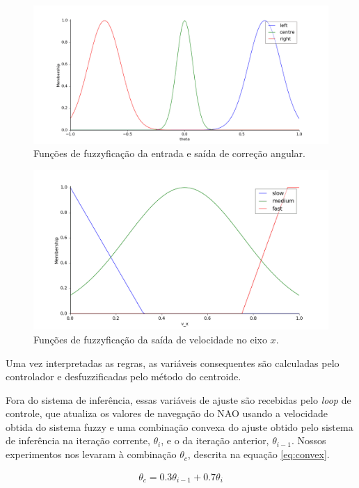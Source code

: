 \documentclass[twoside,conference,a4paper]{IEEEtran}
\begin{document}
\begin{figure}[ht]
\centering
\includegraphics[width=1\hsize]{figuras/theta_fuzzy.png}
\caption{Funções de fuzzyficação da entrada e saída de correção angular.}
\label{fig:theta-fuzzy}
\end{figure}

\begin{figure}[ht]
\centering
\includegraphics[width=1\hsize]{figuras/velocity_fuzzy.png}
\caption{Funções de fuzzyficação da saída de velocidade no eixo $x$.}
\label{fig:velocity-fuzzy}
\end{figure}

Uma vez interpretadas as regras, as variáveis consequentes são calculadas pelo controlador e desfuzzificadas pelo método do centroide.

Fora do sistema de inferência, essas variáveis de ajuste são recebidas pelo \textit{loop} de controle, que atualiza os valores de navegação do NAO usando a velocidade obtida do sistema fuzzy e uma combinação convexa do ajuste obtido pelo sistema de inferência na iteração corrente, $\theta_i$, e o da iteração anterior, $\theta_{i-1}$. Nossos experimentos nos levaram à combinação $\theta_c$, descrita na equação \ref{eq:convex}.

\begin{align}
	\theta_c = 0.3 \theta_{i-1} + 0.7 \theta_i
\label{eq:convex}
\end{align}
\end{document}
